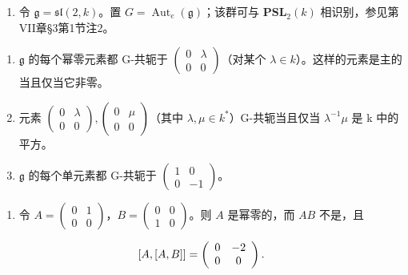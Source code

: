 
\begin{enumerate}
\def\labelenumi{\arabic{enumi})}
\tightlist
\item
  令 \(\mathfrak{g} = \mathfrak{sl}(2, k)\)。置 \(G = \operatorname{Aut}_e(\mathfrak{g})\)；该群可与 \(\mathbf{PSL}_2(k)\) 相识别，参见第VII章§3第1节注2。
\end{enumerate}

\begin{enumerate}
\def\labelenumi{\alph{enumi})}
\item
  \(\mathfrak{g}\) 的每个幂零元素都 G-共轭于 \(\left( \begin{array}{cc}0 & \lambda \\ 0 & 0 \end{array} \right)\)（对某个 \(\lambda \in k\)）。这样的元素是主的当且仅当它非零。
\item
  元素 \(\begin{pmatrix}0&\lambda\\0&0\end{pmatrix},\begin{pmatrix}0&\mu\\0&0\end{pmatrix}\)（其中 \(\lambda,\mu\in k^{*}\)）G-共轭当且仅当 \(\lambda^{-1}\mu\) 是 k 中的平方。
\item
  \(\mathfrak{g}\) 的每个单元素都 G-共轭于 \(\left( \begin{array}{cc}1 & 0\\ 0 & -1 \end{array} \right)\)。
\end{enumerate}

\begin{enumerate}
\def\labelenumi{\arabic{enumi})}
\setcounter{enumi}{1}
\tightlist
\item
  令 \(A = \begin{pmatrix} 0 & 1 \\ 0 & 0 \end{pmatrix}\)，\(B = \begin{pmatrix} 0 & 0 \\ 1 & 0 \end{pmatrix}\)。则 \(A\) 是幂零的，而 \(AB\) 不是，且
\end{enumerate}

\[
[ A, [ A, B ] ] = \left( \begin{array}{c c} 0 & - 2 \\ 0 & 0 \end{array} \right).
\]

